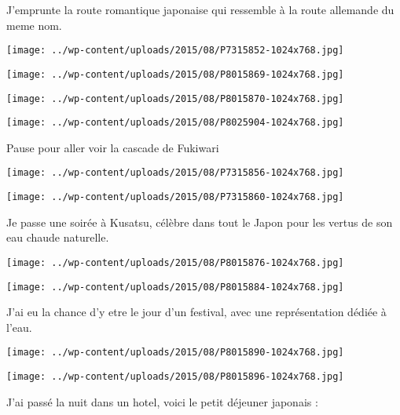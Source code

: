  J'emprunte la route romantique japonaise qui ressemble à la route allemande du meme nom. \newline
 \newline
\centerline{\texttt{[image: ../wp-content/uploads/2015/08/P7315852-1024x768.jpg]} } 
 \newline
 \newline
\centerline{\texttt{[image: ../wp-content/uploads/2015/08/P8015869-1024x768.jpg]} } 
 \newline
 \newline
\centerline{\texttt{[image: ../wp-content/uploads/2015/08/P8015870-1024x768.jpg]} } 
 \newline
 \newline
\centerline{\texttt{[image: ../wp-content/uploads/2015/08/P8025904-1024x768.jpg]} } 
 \newline
 Pause pour aller voir la cascade de Fukiwari \newline
 \newline
\centerline{\texttt{[image: ../wp-content/uploads/2015/08/P7315856-1024x768.jpg]} } 
 \newline
 \newline
\centerline{\texttt{[image: ../wp-content/uploads/2015/08/P7315860-1024x768.jpg]} } 
 \newline
 Je passe une soirée à Kusatsu, célèbre dans tout le Japon pour les vertus de son eau chaude naturelle. \newline
 \newline
\centerline{\texttt{[image: ../wp-content/uploads/2015/08/P8015876-1024x768.jpg]} } 
 \newline
 \newline
\centerline{\texttt{[image: ../wp-content/uploads/2015/08/P8015884-1024x768.jpg]} } 
 \newline
 J'ai eu la chance d'y etre le jour d'un festival, avec une représentation dédiée à l'eau. \newline
 \newline
\centerline{\texttt{[image: ../wp-content/uploads/2015/08/P8015890-1024x768.jpg]} } 
 \newline
 \newline
\centerline{\texttt{[image: ../wp-content/uploads/2015/08/P8015896-1024x768.jpg]} } 
 \newline
 J'ai passé la nuit dans un hotel, voici le petit déjeuner japonais : \newline
